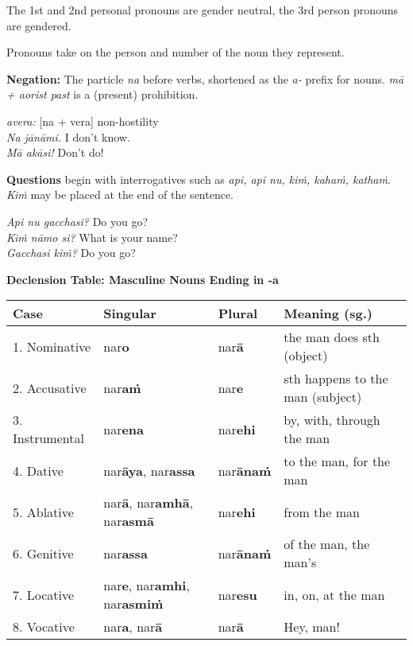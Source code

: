 \documentclass[11pt,oneside]{memoir}
\begin{document}
The 1st and 2nd personal pronouns are gender neutral, the 3rd person pronouns are gendered.

Pronouns take on the person and number of the noun they represent.

\bigskip

\begin{multicols}{2}

\textbf{Negation:} The particle \emph{na} before verbs, shortened as the \emph{a-} prefix for
nouns. \emph{mā + aorist past} is a (present) prohibition.

\emph{avera:} [na + vera] non-hostility \\[0pt]
\emph{Na jānāmi.} I don't know. \\[0pt]
\emph{Mā akāsi!} Don't do!

\columnbreak

\textbf{Questions} begin with interrogatives such as \emph{api, api nu, kiṁ, kahaṁ, kathaṁ}.
\emph{Kiṁ} may be placed at the end of the sentence.

\emph{Api nu gacchasi?} Do you go?\\[0pt]
\emph{Kiṁ nāmo si?} What is your name?\\[0pt]
\emph{Gacchasi kiṁ?} Do you go?

\end{multicols}

\clearpage

\textbf{Declension Table: Masculine Nouns Ending in -a}

\begin{center}
\begin{tabular}{llll}
Case & Singular & Plural & Meaning (sg.)\\[0pt]
\hline
1. Nominative & nar\textbf{o} & nar\textbf{ā} & the man does sth (object)\\[0pt]
2. Accusative & nar\textbf{aṁ} & nar\textbf{e} & sth happens to the man (subject)\\[0pt]
3. Instrumental & nar\textbf{ena} & nar\textbf{ehi} & by, with, through the man\\[0pt]
4. Dative & nar\textbf{āya}, nar\textbf{assa} & nar\textbf{ānaṁ} & to the man, for the man\\[0pt]
5. Ablative & nar\textbf{ā}, nar\textbf{amhā}, nar\textbf{asmā} & nar\textbf{ehi} & from the man\\[0pt]
6. Genitive & nar\textbf{assa} & nar\textbf{ānaṁ} & of the man, the man's\\[0pt]
7. Locative & nar\textbf{e}, nar\textbf{amhi}, nar\textbf{asmiṁ} & nar\textbf{esu} & in, on, at the man\\[0pt]
8. Vocative & nar\textbf{a}, nar\textbf{ā} & nar\textbf{ā} & Hey, man!\\[0pt]
\end{tabular}
\end{center}
\end{document}
